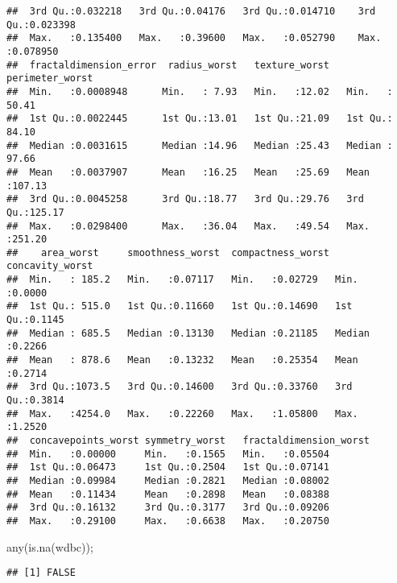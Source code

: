 \documentclass[
]{article}
\newenvironment{Shaded}{\begin{snugshade}}{\end{snugshade}}
\newcommand{\CommentTok}[1]{\textcolor[rgb]{0.56,0.35,0.01}{\textit{#1}}}
\newcommand{\FunctionTok}[1]{\textcolor[rgb]{0.00,0.00,0.00}{#1}}
\newcommand{\NormalTok}[1]{#1}
\newcommand{\OtherTok}[1]{\textcolor[rgb]{0.56,0.35,0.01}{#1}}
\newcommand{\SpecialCharTok}[1]{\textcolor[rgb]{0.00,0.00,0.00}{#1}}
\newcommand{\StringTok}[1]{\textcolor[rgb]{0.31,0.60,0.02}{#1}}
\begin{document}
\begin{verbatim}
##  3rd Qu.:0.032218   3rd Qu.:0.04176   3rd Qu.:0.014710    3rd Qu.:0.023398  
##  Max.   :0.135400   Max.   :0.39600   Max.   :0.052790    Max.   :0.078950  
##  fractaldimension_error  radius_worst   texture_worst   perimeter_worst 
##  Min.   :0.0008948      Min.   : 7.93   Min.   :12.02   Min.   : 50.41  
##  1st Qu.:0.0022445      1st Qu.:13.01   1st Qu.:21.09   1st Qu.: 84.10  
##  Median :0.0031615      Median :14.96   Median :25.43   Median : 97.66  
##  Mean   :0.0037907      Mean   :16.25   Mean   :25.69   Mean   :107.13  
##  3rd Qu.:0.0045258      3rd Qu.:18.77   3rd Qu.:29.76   3rd Qu.:125.17  
##  Max.   :0.0298400      Max.   :36.04   Max.   :49.54   Max.   :251.20  
##    area_worst     smoothness_worst  compactness_worst concavity_worst 
##  Min.   : 185.2   Min.   :0.07117   Min.   :0.02729   Min.   :0.0000  
##  1st Qu.: 515.0   1st Qu.:0.11660   1st Qu.:0.14690   1st Qu.:0.1145  
##  Median : 685.5   Median :0.13130   Median :0.21185   Median :0.2266  
##  Mean   : 878.6   Mean   :0.13232   Mean   :0.25354   Mean   :0.2714  
##  3rd Qu.:1073.5   3rd Qu.:0.14600   3rd Qu.:0.33760   3rd Qu.:0.3814  
##  Max.   :4254.0   Max.   :0.22260   Max.   :1.05800   Max.   :1.2520  
##  concavepoints_worst symmetry_worst   fractaldimension_worst
##  Min.   :0.00000     Min.   :0.1565   Min.   :0.05504       
##  1st Qu.:0.06473     1st Qu.:0.2504   1st Qu.:0.07141       
##  Median :0.09984     Median :0.2821   Median :0.08002       
##  Mean   :0.11434     Mean   :0.2898   Mean   :0.08388       
##  3rd Qu.:0.16132     3rd Qu.:0.3177   3rd Qu.:0.09206       
##  Max.   :0.29100     Max.   :0.6638   Max.   :0.20750
\end{verbatim}

\begin{Shaded}
\begin{Highlighting}[]
\FunctionTok{any}\NormalTok{(}\FunctionTok{is.na}\NormalTok{(wdbc));}
\end{Highlighting}
\end{Shaded}

\begin{verbatim}
## [1] FALSE
\end{verbatim}

\begin{Shaded}
\end{Shaded}
\end{document}
